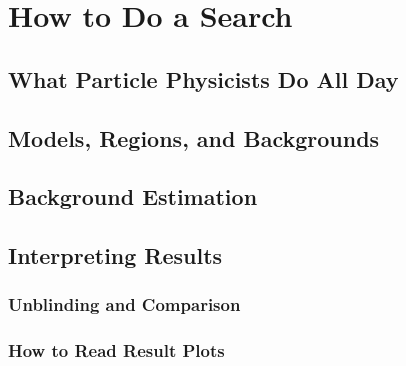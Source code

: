 \chapter{How to Do a Search}

\section{What Particle Physicists Do All Day}

\section{Models, Regions, and Backgrounds}\label{sec:background}

\section{Background Estimation}

\section{Interpreting Results}

\subsection*{Unblinding and Comparison}

\subsection*{How to Read Result Plots}